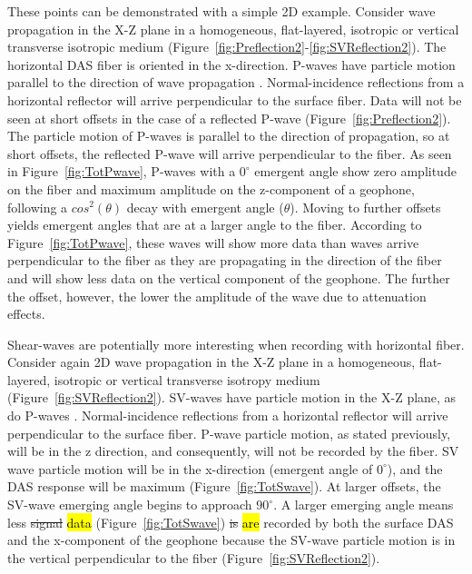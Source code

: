 These points can be demonstrated with a simple 2D example. Consider wave propagation in the X-Z plane in a homogeneous, flat-layered, isotropic or vertical transverse isotropic medium (Figure~\ref{fig:Preflection2}-\ref{fig:SVReflection2}). The horizontal DAS fiber is oriented in the x-direction. P-waves have particle motion parallel to the direction of wave propagation \citep{aki1980quantative}. Normal-incidence reflections from a horizontal reflector will arrive perpendicular to the surface fiber.  Data will not be seen at short offsets in the case of a reflected P-wave (Figure~\ref{fig:Preflection2}). The particle motion of P-waves is parallel to the direction of propagation, so at short offsets, the reflected P-wave will arrive perpendicular to the fiber. As seen in Figure~\ref{fig:TotPwave}, P-waves with a $0^{\circ}$ emergent angle show zero amplitude on the fiber and maximum amplitude on the z-component of a geophone, following a $cos^2(\theta)$ decay with emergent angle ($\theta$). Moving to further offsets yields emergent angles that are at a larger angle to the fiber. According to Figure~\ref{fig:TotPwave}, these waves will show more data than waves arrive perpendicular to the fiber as they are propagating in the direction of the fiber and will show less data on the vertical component of the geophone. The further the offset, however, the lower the amplitude of the wave due to attenuation effects.

Shear-waves are potentially more interesting when recording with horizontal fiber. Consider again 2D wave propagation in the X-Z plane in a homogeneous, flat-layered, isotropic or vertical transverse isotropy medium (Figure~\ref{fig:SVReflection2}). SV-waves have particle motion in the X-Z plane, as do P-waves \citep{aki1980quantative}. Normal-incidence reflections from a horizontal reflector will arrive perpendicular to the surface fiber. P-wave particle motion, as stated previously, will be in the z direction, and consequently, will not be recorded by the fiber. SV wave particle motion will be in the x-direction (emergent angle of $0^{\circ}$), and the DAS response will be maximum (Figure~\ref{fig:TotSwave}). At larger offsets, the SV-wave emerging angle begins to approach $90^{\circ}$. A larger emerging angle means less \sout{signal} \hl{data} (Figure~\ref{fig:TotSwave}) \sout{is} \hl{are} recorded by both the surface DAS and the x-component of the geophone because the SV-wave particle motion is in the vertical perpendicular to the fiber (Figure~\ref{fig:SVReflection2}).

